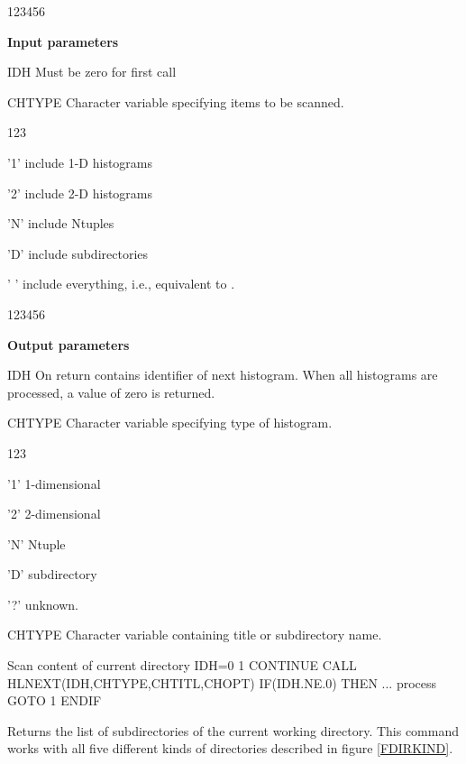 \begin{DLtt}{123456}
\item[{\rm\bf Input parameters}]
\item[IDH] Must be zero for first call
\item[CHTYPE] Character variable specifying items to be scanned.
  \begin{DLtt}{123}
    \item['1'] include 1-D histograms
    \item['2'] include 2-D histograms
    \item['N'] include Ntuples
    \item['D'] include subdirectories
    \item[' '] include everything, i.e., equivalent to .
  \end{DLtt}
\end{DLtt}
\newpage\begin{DLtt}{123456}
\item[{\rm\bf Output parameters}]
\item[IDH] On return contains identifier of next histogram.
           When all histograms are processed, a value of zero
           is returned.
\item[CHTYPE] Character variable specifying type of histogram.
  \begin{DLtt}{123}
    \item['1']   1-dimensional
    \item['2']   2-dimensional
    \item['N']   Ntuple
    \item['D']   subdirectory
    \item['?']   unknown.
  \end{DLtt}
\item[CHTYPE] Character variable containing title
              or subdirectory name.
\end{DLtt}

\begin{XMPt}{Scan content of current directory}
      IDH=0
  1   CONTINUE
      CALL HLNEXT(IDH,CHTYPE,CHTITL,CHOPT)
      IF(IDH.NE.0) THEN
         ... process
         GOTO 1
      ENDIF
\end{XMPt}

\finalnewpage%
 
 
\Action
Returns the list of subdirectories of the current working directory.
This command works with all five different kinds of directories 
described in figure \ref{FDIRKIND}.
 
